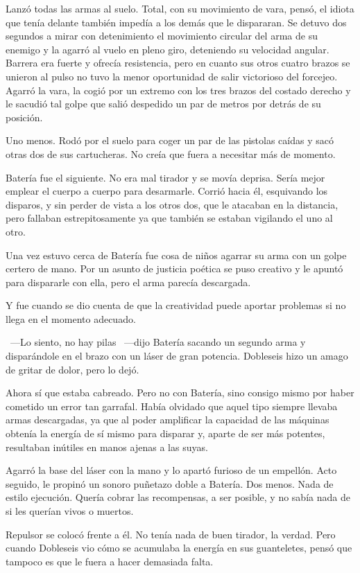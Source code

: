 Lanzó todas las armas al suelo. Total, con su movimiento de vara, pensó, el idiota que tenía delante también impedía a los demás que le dispararan. Se detuvo dos segundos a mirar con detenimiento el movimiento circular del arma de su enemigo y la agarró al vuelo en pleno giro, deteniendo su velocidad angular. Barrera era fuerte y ofrecía resistencia, pero en cuanto sus otros cuatro brazos se unieron al pulso no tuvo la menor oportunidad de salir victorioso del forcejeo. Agarró la vara, la cogió por un extremo con los tres brazos del costado derecho y le sacudió tal golpe que salió despedido un par de metros por detrás de su posición.

Uno menos. Rodó por el suelo para coger un par de las pistolas caídas y sacó otras dos de sus cartucheras. No creía que fuera a necesitar más de momento.

Batería fue el siguiente. No era mal tirador y se movía deprisa. Sería mejor emplear el cuerpo a cuerpo para desarmarle. Corrió hacia él, esquivando los disparos, y sin perder de vista a los otros dos, que le atacaban en la distancia, pero fallaban estrepitosamente ya que también se estaban vigilando el uno al otro.

Una vez estuvo cerca de Batería fue cosa de niños agarrar su arma con un golpe certero de mano. Por un asunto de justicia poética se puso creativo y le apuntó para dispararle con ella, pero el arma parecía descargada.

Y fue cuando se dio cuenta de que la creatividad puede aportar problemas si no llega en el momento adecuado.

~---Lo siento, no hay pilas ~---dijo Batería sacando un segundo arma y disparándole en el brazo con un láser de gran potencia. Dobleseis hizo un amago de gritar de dolor, pero lo dejó.

Ahora sí que estaba cabreado. Pero no con Batería, sino consigo mismo por haber cometido un error tan garrafal. Había olvidado que aquel tipo siempre llevaba armas descargadas, ya que al poder amplificar la capacidad de las máquinas obtenía la energía de sí mismo para disparar y, aparte de ser más potentes, resultaban inútiles en manos ajenas a las suyas.

Agarró la base del láser con la mano y lo apartó furioso de un empellón. Acto seguido, le propinó un sonoro puñetazo doble a Batería. Dos menos. Nada de estilo ejecución. Quería cobrar las recompensas, a ser posible, y no sabía nada de si les querían vivos o muertos.

Repulsor se colocó frente a él. No tenía nada de buen tirador, la verdad. Pero cuando Dobleseis vio cómo se acumulaba la energía en sus guanteletes, pensó que tampoco es que le fuera a hacer demasiada falta.

